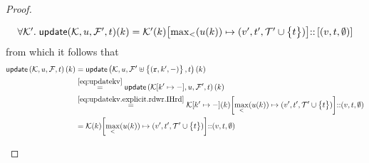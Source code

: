 \begin{proof}
\begin{enumerate}
\begin{itemize}
			\begin{equation}
			\label{eq:updatekv.explicit.rdwr.IHrd}
            \begin{array}{l}
			\forall \mkvs'.\;\updateKV(\mkvs,\vi,\fp',\txid)(\key) = 
            \mkvs'(\key)\rmto{\max_{<}(\vi(\key))}{(\val', \txid', \txidset' \cup \Set{\txid})} \lcat \List{(\val, \txid, \emptyset)}
            \end{array}
			\end{equation}
			from which it follows that 
            \begin{align*}
			    \updateKV[\mkvs, \vi, \fp,\txid](\key)
                & = 
                \updateKV[\mkvs, \vi, \fp' \uplus \Set{(\otR, \key', \stub)}, \txid](\key) \\
                & \stackrel{\cref{eq:updatekv}}{=}
			    \updateKV[\mkvs\rmto{\key'}{\stub}, \vi, \fp', \txid](\key) \\
                & \stackrel{\cref{eq:updatekv.explicit.rdwr.IHrd}}{=} 
                \mkvs\rmto{\key'}{\stub}(\key)\rmto{\max_{<}(\vi(\key))}{(\val', \txid', \txidset' \cup \Set{\txid})} \lcat (\val, \txid, \emptyset) \\
                & = 
                \mkvs(\key)\rmto{\max_{<}(\vi(\key))}{(\val', \txid', \txidset' \cup \Set{\txid})} \lcat (\val, \txid, \emptyset)
            \end{align*}
			

\end{itemize}
\end{enumerate}
\end{proof}
